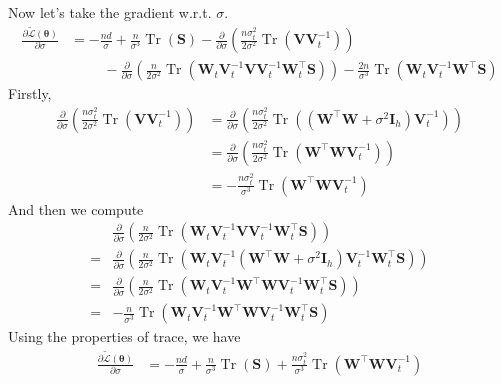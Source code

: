 \documentclass[11pt]{article}
\DeclareMathOperator{\tr}{Tr}
\begin{document}
\begin{enumerate}
\begin{enumerate}
\begin{align*}
    \end{align*}
    Now let's take the gradient w.r.t. $\sigma$.
    \begin{align*}
    \frac{\partial\tilde{\mathcal{L}}(\bm\theta)}{\partial\sigma}
    &= -\frac{nd}{\sigma}+\frac{n}{\sigma^3}\tr(\bm S)-\frac{\partial}{\partial\sigma}\left(\frac{n\sigma_t^2}{2\sigma^2}\tr\left(\bm V\bm V_t^{-1}\right)\right) \\
    &\hspace{1cm} -\frac{\partial}{\partial\sigma}\left(\frac{n}{2\sigma^2}\tr\left(\bm W_t\bm V_t^{-1}\bm V\bm V_t^{-1}\bm W_t^{\top}\bm S\right)\right)-\frac{2n}{\sigma^3}\tr\left(\bm W_t\bm V_t^{-1}\bm W^{\top}\bm S\right)
    \end{align*}
    Firstly,
    \begin{align*}
    \frac{\partial}{\partial\sigma}\left(\frac{n\sigma_t^2}{2\sigma^2}\tr\left(\bm V\bm V_t^{-1}\right)\right)
    &= \frac{\partial}{\partial\sigma}\left(\frac{n\sigma_t^2}{2\sigma^2}\tr\left((\bm W^{\top}\bm W+\sigma^2\bm I_h)\bm V_t^{-1}\right)\right) \\
    &= \frac{\partial}{\partial\sigma}\left(\frac{n\sigma_t^2}{2\sigma^2}\tr\left(\bm W^{\top}\bm W\bm V_t^{-1}\right)\right) \\
    &= -\frac{n\sigma_t^2}{\sigma^3}\tr\left(\bm W^{\top}\bm W\bm V_t^{-1}\right)
    \end{align*}
    And then we compute
    \begin{align*}
    & \frac{\partial}{\partial\sigma}\left(\frac{n}{2\sigma^2}\tr\left(\bm W_t\bm V_t^{-1}\bm V\bm V_t^{-1}\bm W_t^{\top}\bm S\right)\right) \\
    =& \frac{\partial}{\partial\sigma}\left(\frac{n}{2\sigma^2}\tr\left(\bm W_t\bm V_t^{-1}(\bm W^{\top}\bm W+\sigma^2\bm I_h)\bm V_t^{-1}\bm W_t^{\top}\bm S\right)\right) \\
    =& \frac{\partial}{\partial\sigma}\left(\frac{n}{2\sigma^2}\tr\left(\bm W_t\bm V_t^{-1}\bm W^{\top}\bm W\bm V_t^{-1}\bm W_t^{\top}\bm S\right)\right) \\
    =& -\frac{n}{\sigma^3}\tr\left(\bm W_t\bm V_t^{-1}\bm W^{\top}\bm W\bm V_t^{-1}\bm W_t^{\top}\bm S\right)
    \end{align*}
    Using the properties of trace, we have
    \begin{align*}
    \frac{\partial\tilde{\mathcal{L}}(\bm\theta)}{\partial\sigma}
    &= -\frac{nd}{\sigma}+\frac{n}{\sigma^3}\tr(\bm S)+\frac{n\sigma_t^2}{\sigma^3}\tr\left(\bm W^{\top}\bm W\bm V_t^{-1}\right) \\

\end{align*}
\end{enumerate}
\end{enumerate}
\end{document}
